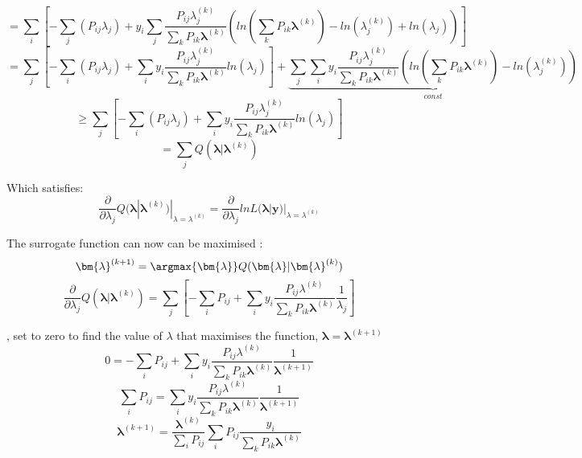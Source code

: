 \begin{equation}
= \sum_i \left[  -\sum_j (P_{ij} \lambda_j) + y_i  \sum_j \frac{P_{ij}\lambda^{(k)}_j}{\sum_k P_{ik} \bm{\lambda}^{(k)}} (ln(\sum_k P_{ik} \bm{\lambda}^{(k)}) - ln(\lambda^{(k)}_j) + ln( \lambda_j ) )  \right]
\end{equation}
\begin{equation}
= \sum_j \left[  -\sum_i (P_{ij} \lambda_j) + \sum_i y_i \frac{P_{ij}\lambda^{(k)}_j}{\sum_k P_{ik} \bm{\lambda}^{(k)}} ln( \lambda_j )  \right]  + \underbrace {\sum_j  \sum_i y_i \frac{P_{ij}\lambda^{(k)}_j}{\sum_k P_{ik} \bm{\lambda}^{(k)}} (ln(\sum_k P_{ik} \bm{\lambda}^{(k)})- ln(\lambda^{(k)}_j))}_{const}
\end{equation} 
\begin{equation}
\geq \sum_j \left[  -\sum_i (P_{ij} \lambda_j) + \sum_i y_i \frac{P_{ij}\lambda^{(k)}_j}{\sum_k P_{ik} \bm{\lambda}^{(k)}} ln( \lambda_j )  \right]  
\end{equation} 
\begin{equation}
=  \sum_j Q(\bm{\lambda}|\bm{\lambda}^{(k)})
\end{equation} 

Which satisfies: 
\begin{equation}
\frac{\partial }{\partial \lambda_j} Q(\bm{\lambda}|\bm{\lambda}^{(k)})|_{\lambda=\lambda^{(k)}} = \frac{\partial }{\partial \lambda_j} lnL(\bm{\lambda}|\bm{y})|_{\lambda=\lambda^{(k)}}
\end{equation} 

The surrogate function can now can be maximised :
\begin{equation}
\bm{\lambda}^{(k+1)} = \argmax{\bm{\lambda}}Q(\bm{\lambda}|\bm{\lambda}^{(k)}) 
\end{equation}
\begin{equation}
\frac{\partial }{\partial \lambda_j} Q(\bm{\lambda}|\bm{\lambda}^{(k)}) = \sum_j \left[  -\sum_i P_{ij}  + \sum_i y_i \frac{P_{ij} \lambda^{(k)}}{\sum_k P_{ik} \bm{\lambda}^{(k)}} \frac{1}{\lambda_j}  \right]  
\end{equation}

, set to zero to find the value of $\lambda$ that maximises the function, $\bm{\lambda} = \bm{\lambda}^{(k+1)}$
\begin{equation}
0 =  -\sum_i P_{ij}  + \sum_i y_i \frac{P_{ij} \lambda^{(k)}}{\sum_k P_{ik} \bm{\lambda}^{(k)}} \frac{1}{\bm\lambda^{(k+1)}} 
\end{equation}
\begin{equation}
\sum_i P_{ij} =  \sum_i y_i \frac{P_{ij} \lambda^{(k)} }{\sum_k P_{ik} \bm{\lambda}^{(k)}} \frac{1}{\bm\lambda^{(k+1)}} 
\end{equation}
\begin{equation}
\bm\lambda^{(k+1)} = \frac{\bm\lambda^{(k)}}{\sum_i P_{ij}} \sum_i P_{ij} \frac{y_i}{\sum_k P_{ik} \bm{\lambda}^{(k)}}
\end{equation}
